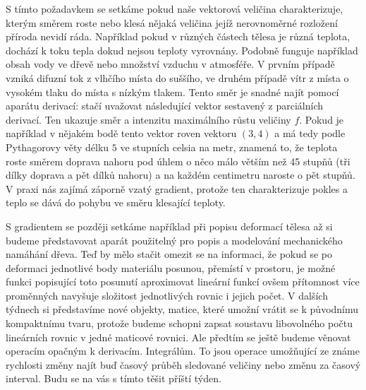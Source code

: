 \documentclass[12pt]{article}
\begin{document}
S tímto požadavkem se setkáme pokud naše vektorová veličina charakterizuje, kterým směrem roste nebo klesá nějaká veličina jejíž nerovnoměrné rozložení příroda nevidí ráda. Například pokud v různých částech tělesa je různá teplota, dochází k toku tepla dokud nejsou teploty vyrovnány. Podobně funguje například obsah vody ve dřevě nebo množství vzduchu v atmosféře. V prvním případě vzniká difuzní tok z vlhčího místa do suššího, ve druhém případě vítr z místa o vysokém tlaku do místa s nízkým tlakem. Tento směr je snadné najít pomocí aparátu derivací: stačí uvažovat následující vektor sestavený z parciálních derivací. Ten ukazuje směr a intenzitu maximálního růstu veličiny $f$. Pokud je například v nějakém bodě tento vektor roven vektoru $(3,4)$ a má tedy podle Pythagorovy věty délku $5$ ve stupních celsia na metr, znamená to, že teplota roste směrem doprava nahoru pod úhlem o něco málo větším než 45 stupňů (tři dílky doprava a pět dílků nahoru) a na každém centimetru naroste o pět stupňů. V praxi nás zajímá záporně vzatý gradient, protože ten charakterizuje pokles a teplo se dává do pohybu ve směru klesající teploty. 

S gradientem se později setkáme například při popisu deformací tělesa až si budeme představovat aparát použitelný pro popis a modelování mechanického namáhání dřeva. Teď by mělo stačit omezit se na informaci, že pokud se po deformaci jednotlivé body materiálu posunou, přemístí v prostoru, je možné funkci popisující toto posunutí aproximovat lineární funkcí ovšem přítomnost více proměnných navyšuje složitost jednotlivých rovnic i jejich počet. V dalších týdnech si představíme nové objekty, matice, které umožní vrátit se k původnímu kompaktnímu tvaru, protože budeme schopni zapsat soustavu libovolného počtu lineárních rovnic v jedné maticové rovnici. Ale předtím se ještě budeme věnovat operacím opačným k derivacím. Integrálům. To jsou operace umožňující ze známe rychlosti změny najít buď časový průběh sledované veličiny nebo změnu za časový interval. Budu se na vás s tímto těšit příští týden. 
\end{document}
